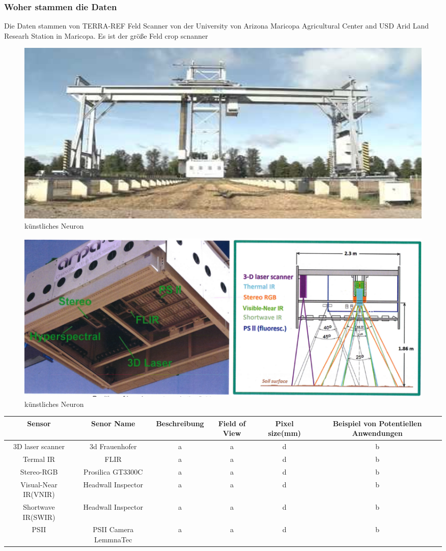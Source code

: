 \documentclass{llncs}
\begin{document}
\subsubsection{Woher stammen die Daten}

Die Daten stammen von TERRA-REF Feld Scanner von der University von Arizona Maricopa Agricultural Center and USD Arid Land Researh Station in Maricopa. Es ist der größe Feld crop scnanner 
\begin{figure}[htbp] 
	\centering
	\includegraphics[width=1.0\textwidth]{lematech_1.png}
	\caption{künstliches Neuron}
	\label{fig:Bild1}
\end{figure}
\begin{figure}[htbp] 
	\centering
	\includegraphics[width=1.0\textwidth]{lematech_2.png}
	\caption{künstliches Neuron}
	\label{fig:Bild1}
\end{figure}

\begin{tabular}{|c|c|c|c|c|c|}\hline
	Sensor & Senor Name & Beschreibung & Field of View & Pixel size(mm) & Beispiel von Potentiellen Anwendungen \\ \hline
	3D laser scanner & 3d Frauenhofer & a&a&d&b \\ \hline
	Termal IR & FLIR & a&a&d&b \\ \hline
	Stereo-RGB & Prosilica GT3300C & a&a&d&b\\ \hline
	Visual-Near IR(VNIR) & Headwall  Inspector & a&a&d&b\\ \hline
	Shortwave IR(SWIR) & Headwall Inspector & a&a&d&b\\ \hline
	PSII & PSII Camera LemmnaTec & a&a&d&b\\ \hline
\end{tabular}
\end{document}
